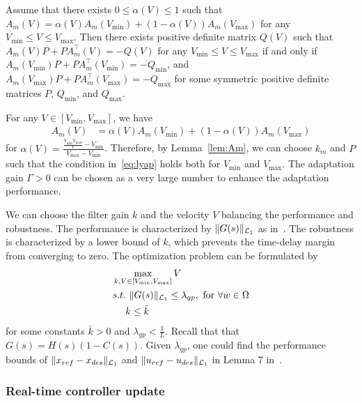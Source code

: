 \documentclass[letterpaper, 10 pt, conference]{ieeeconf}
\begin{document}
\begin{lemma}
Assume that there exists $0\leq \alpha(V) \leq 1$ such that $A_m(V) = \alpha(V) A_m(V_{\min}) + (1-\alpha(V)) A_m(V_{\max})$ for any $V_{\min} \leq V \leq V_{\max}$.
Then there exists positive definite matrix $Q(V)$ 
such that $A_m(V) P + P A_m^\top(V) =-Q(V)$ for any $V_{\min} \leq V \leq V_{\max}$ if and only if $A_m(V_{\min}) P + P A_m^\top(V_{\min})=-Q_{\min}$, and $A_m(V_{\max}) P + P A_m^\top(V_{\max}) = -Q_{\max}$ for some symmetric positive definite matrices $P$, $Q_{\min}$, and $Q_{\max}$.
\label{lem:Am}
\end{lemma}

For any $V \in [V_{\min},V_{\max}]$, we have
\begin{align*}
A_m(V) &= \alpha(V) A_m(V_{\min}) + (1-\alpha(V)) A_m(V_{\max})
\end{align*}
for $\alpha(V)=\frac{\frac{V_{\min}V_{\max}}{V}-V_{\min}}{V_{\max}-V_{\min}}$. Therefore, by Lemma~\ref{lem:Am}, we can choose $k_m$ and $P$ such that the condition in~\eqref{eq:lyap} holds both for $V_{\min}$ and $V_{\max}$.
The adaptation gain $\Gamma>0$ can be chosen as a very large number to enhance the adaptation performance.

We can choose the filter gain $k$ and the velocity $V$
balancing the performance and robustness.
The performance is characterized by $\|G(s)\|_{\mathcal{L}_1}$ as in~\cite{li2008filter}. The robustness is characterized by a lower bound of $k$, which prevents the time-delay margin from converging to zero.
The optimization problem can be formulated by
\begin{align}
    &\max_{k,V \in [V_{\min},V_{\max}]} V\nonumber\\
    &s.t. \ \|G(s)\|_{\mathcal{L}_1} \leq \lambda_{gp}, {\rm \ for \ } \forall w \in \Omega\nonumber\\
    &\quad \ k \leq \bar{k}
    \label{eq:prog}
\end{align}
for some constants $\bar{k}>0$ and $\lambda_{gp}<\frac{1}{L}$. Recall that that $G(s) = H(s)(1-C(s))$. Given $\lambda_{gp}$, one could find the performance bounds of $\|x_{ref}-x_{des}\|_{\mathcal{L}_1}$ and $\|u_{ref}-u_{des}\|_{\mathcal{L}_1}$ in Lemma 7 in~\cite{cao2008design}.

\subsubsection{Real-time controller update}\label{sec:parameter}
\end{document}
